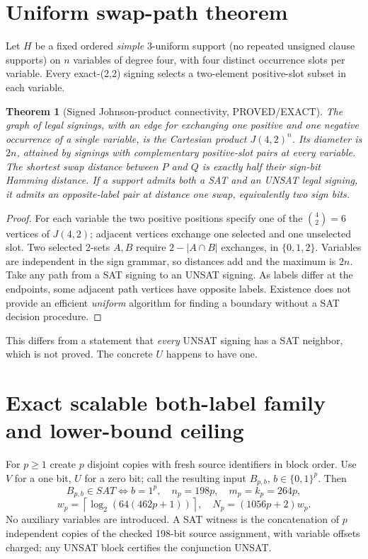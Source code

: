 \documentclass[11pt]{article}
\newtheorem{theorem}{Theorem}
\begin{document}
\section{Uniform swap-path theorem}
Let $H$ be a fixed ordered \emph{simple} 3-uniform support (no repeated unsigned clause supports) on $n$ variables of degree four, with four distinct occurrence slots per variable. Every exact-(2,2) signing selects a two-element positive-slot subset in each variable.
\begin{theorem}[Signed Johnson-product connectivity, PROVED/EXACT]
The graph of legal signings, with an edge for exchanging one positive and one negative occurrence of a \emph{single} variable, is the Cartesian product $J(4,2)^n$. Its diameter is $2n$, attained by signings with complementary positive-slot pairs at every variable. The shortest swap distance between $P$ and $Q$ is exactly half their sign-bit Hamming distance. If a support admits both a SAT and an UNSAT legal signing, it admits an opposite-label pair at distance one swap, equivalently two sign bits.
\end{theorem}
\begin{proof}
For each variable the two positive positions specify one of the $\binom42=6$ vertices of $J(4,2)$; adjacent vertices exchange one selected and one unselected slot. Two selected 2-sets $A,B$ require $2-|A\cap B|$ exchanges, in $\{0,1,2\}$. Variables are independent in the sign grammar, so distances add and the maximum is $2n$. Take any path from a SAT signing to an UNSAT signing. As labels differ at the endpoints, some adjacent path vertices have opposite labels. Existence does not provide an efficient \emph{uniform} algorithm for finding a boundary without a SAT decision procedure.
\end{proof}
This differs from a statement that \emph{every} UNSAT signing has a SAT neighbor, which is not proved. The concrete $U$ happens to have one.

\section{Exact scalable both-label family and lower-bound ceiling}
For $p\ge1$ create $p$ disjoint copies with fresh source identifiers in block order. Use $V$ for a one bit, $U$ for a zero bit; call the resulting input $B_{p,b}$, $b\in\{0,1\}^p$. Then
\[
B_{p,b}\in SAT\iff b=1^p,\quad n_p=198p,\quad m_p=k_p=264p,
\]
\[
w_p=\left\lceil\log_2(64(462p+1))\right\rceil,\quad
N_p=(1056p+2)w_p.
\]
No auxiliary variables are introduced. A SAT witness is the concatenation of $p$ independent copies of the checked 198-bit source assignment, with variable offsets charged; any UNSAT block certifies the conjunction UNSAT.
\end{document}
